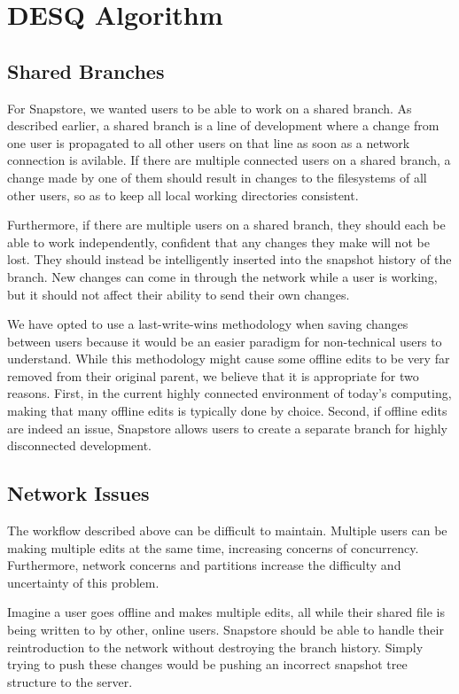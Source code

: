 \chapter{DESQ Algorithm}

\section{Shared Branches}

For Snapstore, we wanted users to be able to work on a shared branch. As described earlier, a shared branch is a line of development where a change from one user is propagated to all other users on that line as soon as a network connection is avilable. If there are multiple connected users on a shared branch, a change made by one of them should result in changes to the filesystems of all other users, so as to keep all local working directories consistent.

Furthermore, if there are multiple users on a shared branch, they should each be able to work independently, confident that any changes they make will not be lost. They should instead be intelligently inserted into the snapshot history of the branch. New changes can come in through the network while a user is working, but it should not affect their ability to send their own changes.

We have opted to use a last-write-wins methodology when saving changes between users because it would be an easier paradigm for non-technical users to understand. While this methodology might cause some offline edits to be very far removed from their original parent, we believe that it is appropriate for two reasons. First, in the current highly connected environment of today's computing, making that many offline edits is typically done by choice. Second, if offline edits are indeed an issue, Snapstore allows users to create a separate branch for highly disconnected development. 

\section{Network Issues}

The workflow described above can be difficult to maintain. Multiple users can be making multiple edits at the same time, increasing concerns of concurrency.  Furthermore, network concerns and partitions increase the difficulty and uncertainty of this problem. 

Imagine a user goes offline and makes multiple edits, all while their shared file is being written to by other, online users. Snapstore should be able to handle their reintroduction to the network without destroying the branch history. Simply trying to push these changes would be pushing an incorrect snapshot tree structure to the server. 

